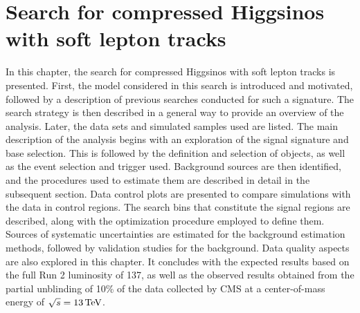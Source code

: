\chapter[Search for compressed Higgsinos]{Search for compressed Higgsinos with soft lepton tracks}
\label{sec:search}

In this chapter, the search for compressed Higgsinos with soft lepton tracks is presented.
First, the model considered in this search is introduced and motivated, followed by a description of previous searches conducted for such a signature. The search strategy is then described in a general way to provide an overview of the analysis. Later, the data sets and simulated samples used are listed. The main description of the analysis begins with an exploration of the signal signature and base selection. This is followed by the definition and selection of objects, as well as the event selection and trigger used. Background sources are then identified, and the procedures used to estimate them are described in detail in the subsequent section. Data control plots are presented to compare simulations with the data in control regions. The search bins that constitute the signal regions are described, along with the optimization procedure employed to define them. Sources of systematic uncertainties are estimated for the background estimation methods, followed by validation studies for the background. Data quality aspects are also explored in this chapter. It concludes with the expected results based on the full Run 2 luminosity of 137\fbinv, as well as the observed results obtained from the partial unblinding of 10\% of the data collected by CMS at a center-of-mass energy of $\sqrt{s}=13\,\text{Te\hspace{-.08em}V}$.





























